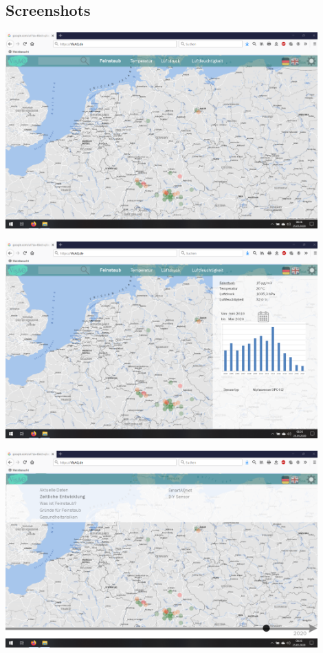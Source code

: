 \subsection{Screenshots}
\label{Screenshots}

\begin{center}
	\includegraphics[width=0.9\textwidth]{Screenshots/Startseite} 
	
	\includegraphics[width=0.9\textwidth]{Screenshots/Aktuelle-Daten} 

	\includegraphics[width=0.9\textwidth]{Screenshots/Zeitliche-Entwicklung} 
	

\end{center}

